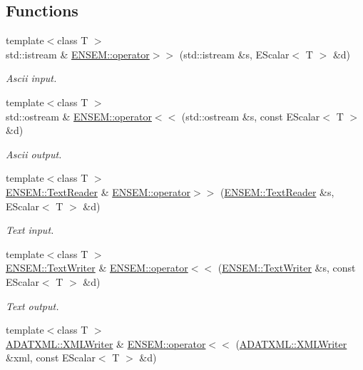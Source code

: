 \subsection*{Functions}
\begin{DoxyCompactItemize}
\item 
{\footnotesize template$<$class T $>$ }\\std\+::istream \& \mbox{\hyperlink{group__escalar_gae1745a4a5cc3b43ab391d57412135dbd}{E\+N\+S\+E\+M\+::operator$>$$>$}} (std\+::istream \&s, E\+Scalar$<$ T $>$ \&d)
\begin{DoxyCompactList}\small\item\em Ascii input. \end{DoxyCompactList}\item 
{\footnotesize template$<$class T $>$ }\\std\+::ostream \& \mbox{\hyperlink{group__escalar_ga2a24d07560f549aee97bb63ceed9ed50}{E\+N\+S\+E\+M\+::operator$<$$<$}} (std\+::ostream \&s, const E\+Scalar$<$ T $>$ \&d)
\begin{DoxyCompactList}\small\item\em Ascii output. \end{DoxyCompactList}\item 
{\footnotesize template$<$class T $>$ }\\\mbox{\hyperlink{classENSEM_1_1TextReader}{E\+N\+S\+E\+M\+::\+Text\+Reader}} \& \mbox{\hyperlink{group__escalar_ga0011ba4db6e989d9517d29f0dd411ba4}{E\+N\+S\+E\+M\+::operator$>$$>$}} (\mbox{\hyperlink{classENSEM_1_1TextReader}{E\+N\+S\+E\+M\+::\+Text\+Reader}} \&s, E\+Scalar$<$ T $>$ \&d)
\begin{DoxyCompactList}\small\item\em Text input. \end{DoxyCompactList}\item 
{\footnotesize template$<$class T $>$ }\\\mbox{\hyperlink{classENSEM_1_1TextWriter}{E\+N\+S\+E\+M\+::\+Text\+Writer}} \& \mbox{\hyperlink{group__escalar_ga4fa895e4a145c879739c3f8497717e98}{E\+N\+S\+E\+M\+::operator$<$$<$}} (\mbox{\hyperlink{classENSEM_1_1TextWriter}{E\+N\+S\+E\+M\+::\+Text\+Writer}} \&s, const E\+Scalar$<$ T $>$ \&d)
\begin{DoxyCompactList}\small\item\em Text output. \end{DoxyCompactList}\item 
{\footnotesize template$<$class T $>$ }\\\mbox{\hyperlink{classADATXML_1_1XMLWriter}{A\+D\+A\+T\+X\+M\+L\+::\+X\+M\+L\+Writer}} \& \mbox{\hyperlink{group__escalar_gae78b4ef06a7e72aa75cae11dd9c48327}{E\+N\+S\+E\+M\+::operator$<$$<$}} (\mbox{\hyperlink{classADATXML_1_1XMLWriter}{A\+D\+A\+T\+X\+M\+L\+::\+X\+M\+L\+Writer}} \&xml, const E\+Scalar$<$ T $>$ \&d)

\end{DoxyCompactItemize}
